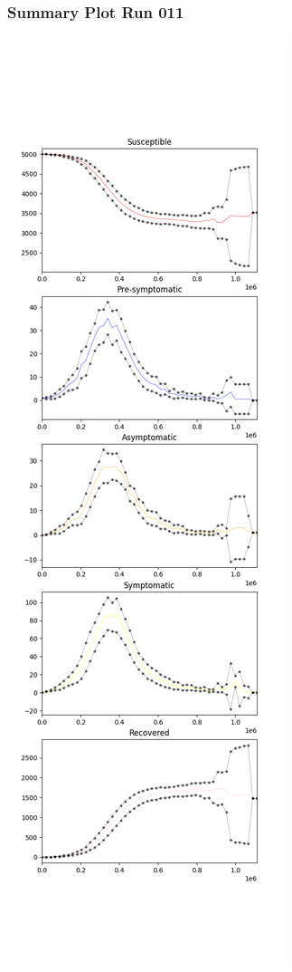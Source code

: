 \documentclass{article}
\begin{document}
\subsubsection{Summary Plot Run 011}
\includegraphics[scale=0.4]{plot_summary_run_011.png}
\end{document}
